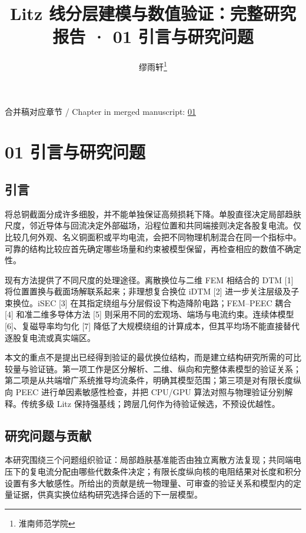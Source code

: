 \documentclass[journal,10pt]{IEEEtran}
\begin{document}
\title{Litz 线分层建模与数值验证：完整研究报告 · 01 引言与研究问题}
\author{缪雨轩\thanks{淮南师范学院}}

\maketitle
\noindent 合并稿对应章节 / Chapter in merged manuscript: \href{report_zh-CN_ieee.pdf#chapter-01}{01}\par
\FloatBarrier
\section*{01 引言与研究问题}
\hypertarget{chapter-01}{}
\subsection*{引言}
\hypertarget{01.introduction.heading}{}
将总铜截面分成许多细股，并不能单独保证高频损耗下降。单股直径决定局部趋肤尺度，邻近导体与回流决定外部磁场，沿程位置和共同端接则决定各股复电流。仅比较几何外观、名义铜面积或平均电流，会把不同物理机制混合在同一个指标中。可靠的结构比较应首先确定哪些场量和约束被模型保留，再检查相应的数值不确定性。


现有方法提供了不同尺度的处理途径。离散换位与二维 FEM 相结合的 DTM [1] 将位置置换与截面场解联系起来；非理想复合换位 iDTM [2] 进一步关注层级及子束换位。iSEC [3] 在其指定绕组与分层假设下构造降阶电路；FEM–PEEC 耦合 [4] 和准二维多导体方法 [5] 则采用不同的宏观场、端场与电流约束。连续体模型 [6]、复磁导率均匀化 [7] 降低了大规模绕组的计算成本，但其平均场不能直接替代逐股复电流或真实端区。


本文的重点不是提出已经得到验证的最优换位结构，而是建立结构研究所需的可比较量与验证链。第一项工作是区分解析、二维、纵向和完整体素模型的验证关系；第二项是从共端增广系统推导均流条件，明确其模型范围；第三项是对有限长度纵向 PEEC 进行单因素敏感性检查，并把 CPU/GPU 算法对照与物理验证分别解释。传统多级 Litz 保持强基线；跨层几何作为待验证候选，不预设优越性。


\subsection*{研究问题与贡献}
\hypertarget{01.scope.heading}{}
本研究围绕三个问题组织验证：局部趋肤基准能否由独立离散方法复现；共同端电压下的复电流分配由哪些代数条件决定；有限长度纵向核的电阻结果对长度和积分设置有多大敏感性。所给出的贡献是统一物理量、可审查的验证关系和模型内的定量证据，供真实换位结构研究选择合适的下一层模型。
\end{document}
